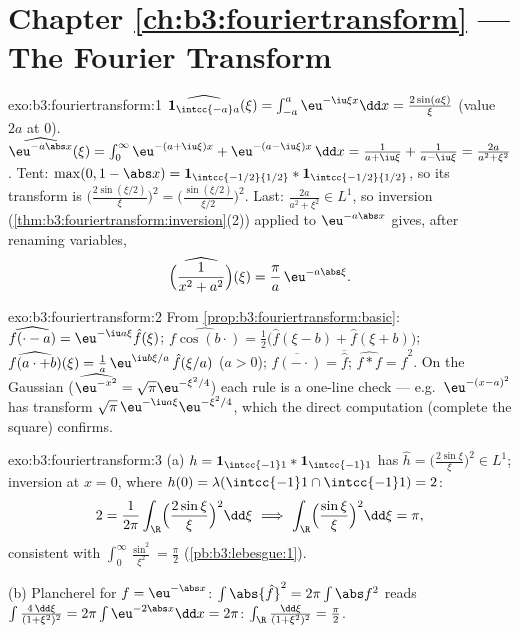 \section*{Chapter \ref{ch:b3:fouriertransform} --- The Fourier
Transform}

\begin{solution}{exo:b3:fouriertransform:1}
$\widehat{\mathbf 1_{\intcc{-a}a}}(\xi) =
\int_{-a}^a\eu^{-\iu\xi x}\dd x = \frac{2\sin(a\xi)}{\xi}$
(value $2a$ at $0$).
$\widehat{\eu^{-a\abs x}}(\xi) = \int_0^\infty\eu^{-(a +
\iu\xi)x} + \eu^{-(a - \iu\xi)x}\,\dd x = \frac1{a + \iu\xi} +
\frac1{a - \iu\xi} = \frac{2a}{a^2 + \xi^2}$.
Tent: $\max(0, 1 - \abs x) = \mathbf 1_{\intcc{-1/2}{1/2}} *
\mathbf 1_{\intcc{-1/2}{1/2}}$, so its transform is
$\bigl(\frac{2\sin(\xi/2)}\xi\bigr)^2 =
\bigl(\frac{\sin(\xi/2)}{\xi/2}\bigr)^2$.
Last: $\frac{2a}{a^2+\xi^2} \in L^1$, so inversion
(\cref{thm:b3:fouriertransform:inversion}(2)) applied to
$\eu^{-a\abs x}$ gives, after renaming variables,
\[
\widehat{\Bigl(\frac1{x^2 + a^2}\Bigr)}(\xi) =
\frac{\pi}{a}\,\eu^{-a\abs\xi} .
\]
\end{solution}

\begin{solution}{exo:b3:fouriertransform:2}
From \cref{prop:b3:fouriertransform:basic}:
$\widehat{f(\cdot - a)} = \eu^{-\iu a\xi}\hat f(\xi)$;
$\widehat{f\cos(b\cdot)} = \frac12\bigl(\hat f(\xi - b) + \hat
f(\xi + b)\bigr)$;
$\widehat{f(a\cdot + b)}(\xi) = \frac1a\,\eu^{\iu
b\xi/a}\,\hat f(\xi/a)$ ($a > 0$);
$\widehat{\overline{f(-\cdot)}} = \overline{\hat f}$;
$\widehat{f * f} = \hat f^2$. On the Gaussian
($\widehat{\eu^{-x^2}} = \sqrt\pi\eu^{-\xi^2/4}$) each rule is
a one-line check --- e.g.\ $\eu^{-(x-a)^2}$ has transform
$\sqrt\pi\,\eu^{-\iu a\xi}\eu^{-\xi^2/4}$, which the direct
computation (complete the square) confirms.
\end{solution}

\begin{solution}{exo:b3:fouriertransform:3}
(a) $h = \mathbf 1_{\intcc{-1}1}*\mathbf 1_{\intcc{-1}1}$ has
$\hat h = \bigl(\frac{2\sin\xi}\xi\bigr)^2 \in L^1$; inversion
at $x = 0$, where $h(0) = \lambda(\intcc{-1}1\cap\intcc{-1}1)
= 2$:
\[
2 = \frac1{2\pi}\int_\R\Bigl(\frac{2\sin\xi}\xi\Bigr)^2
\dd\xi
\ \Longrightarrow\
\int_\R\Bigl(\frac{\sin\xi}\xi\Bigr)^2\dd\xi = \pi ,
\]
consistent with $\int_0^\infty\frac{\sin^2}{\xi^2} =
\frac\pi2$ (\cref{pb:b3:lebesgue:1}).

(b) Plancherel for $f = \eu^{-\abs x}$: $\int\abs{\hat f}^2 =
2\pi\int\abs f^2$ reads $\int\frac{4\,\dd\xi}{(1 + \xi^2)^2} =
2\pi\int\eu^{-2\abs x}\dd x = 2\pi$:
$\int_\R\frac{\dd\xi}{(1+\xi^2)^2} = \frac\pi2$.
\end{solution}

